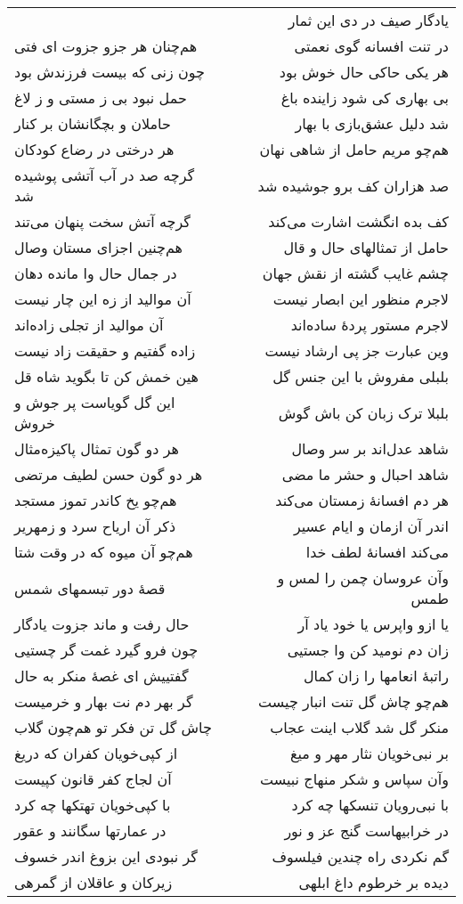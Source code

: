 \begin{center}
\begin{longtable}{l p{0.5cm} r}
&&
یادگار صیف در دی این ثمار
\\
هم‌چنان هر جزو جزوت ای فتی
&&
در تنت افسانه گوی نعمتی
\\
چون زنی که بیست فرزندش بود
&&
هر یکی حاکی حال خوش بود
\\
حمل نبود بی ز مستی و ز لاغ
&&
بی بهاری کی شود زاینده باغ
\\
حاملان و بچگانشان بر کنار
&&
شد دلیل عشق‌بازی با بهار
\\
هر درختی در رضاع کودکان
&&
هم‌چو مریم حامل از شاهی نهان
\\
گرچه صد در آب آتشی پوشیده شد
&&
صد هزاران کف برو جوشیده شد
\\
گرچه آتش سخت پنهان می‌تند
&&
کف بده انگشت اشارت می‌کند
\\
هم‌چنین اجزای مستان وصال
&&
حامل از تمثالهای حال و قال
\\
در جمال حال وا مانده دهان
&&
چشم غایب گشته از نقش جهان
\\
آن موالید از زه این چار نیست
&&
لاجرم منظور این ابصار نیست
\\
آن موالید از تجلی زاده‌اند
&&
لاجرم مستور پردهٔ ساده‌اند
\\
زاده گفتیم و حقیقت زاد نیست
&&
وین عبارت جز پی ارشاد نیست
\\
هین خمش کن تا بگوید شاه قل
&&
بلبلی مفروش با این جنس گل
\\
این گل گویاست پر جوش و خروش
&&
بلبلا ترک زبان کن باش گوش
\\
هر دو گون تمثال پاکیزه‌مثال
&&
شاهد عدل‌اند بر سر وصال
\\
هر دو گون حسن لطیف مرتضی
&&
شاهد احبال و حشر ما مضی
\\
هم‌چو یخ کاندر تموز مستجد
&&
هر دم افسانهٔ زمستان می‌کند
\\
ذکر آن اریاح سرد و زمهریر
&&
اندر آن ازمان و ایام عسیر
\\
هم‌چو آن میوه که در وقت شتا
&&
می‌کند افسانهٔ لطف خدا
\\
قصهٔ دور تبسمهای شمس
&&
وآن عروسان چمن را لمس و طمس
\\
حال رفت و ماند جزوت یادگار
&&
یا ازو واپرس یا خود یاد آر
\\
چون فرو گیرد غمت گر چستیی
&&
زان دم نومید کن وا جستیی
\\
گفتییش ای غصهٔ منکر به حال
&&
راتبهٔ انعامها را زان کمال
\\
گر بهر دم نت بهار و خرمیست
&&
هم‌چو چاش گل تنت انبار چیست
\\
چاش گل تن فکر تو هم‌چون گلاب
&&
منکر گل شد گلاب اینت عجاب
\\
از کپی‌خویان کفران که دریغ
&&
بر نبی‌خویان نثار مهر و میغ
\\
آن لجاج کفر قانون کپیست
&&
وآن سپاس و شکر منهاج نبیست
\\
با کپی‌خویان تهتکها چه کرد
&&
با نبی‌رویان تنسکها چه کرد
\\
در عمارتها سگانند و عقور
&&
در خرابیهاست گنج عز و نور
\\
گر نبودی این بزوغ اندر خسوف
&&
گم نکردی راه چندین فیلسوف
\\
زیرکان و عاقلان از گمرهی
&&
دیده بر خرطوم داغ ابلهی
\\
\end{longtable}
\end{center}
